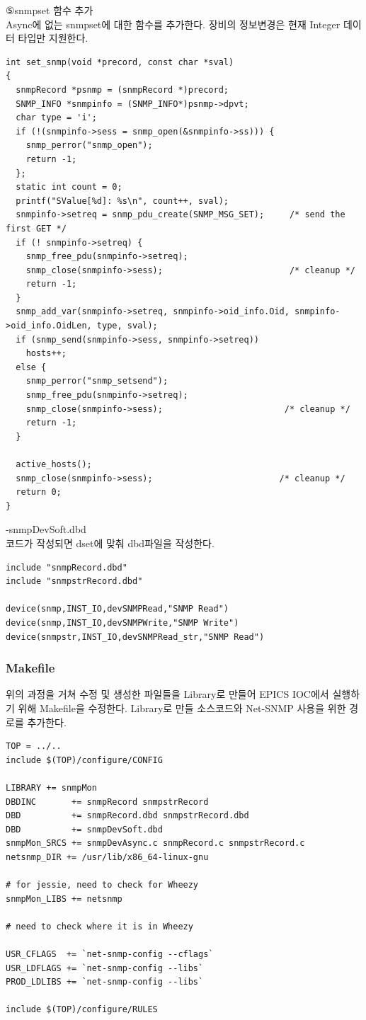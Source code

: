 \documentclass[11pt
  , a4paper
  , article
  , oneside
]{memoir}
\begin{document}
⑤snmpset 함수 추가\\
Async에 없는 snmpset에 대한 함수를 추가한다. 장비의 정보변경은 현재 Integer 데이터 타입만 지원한다.
{\scriptsize
\begin{lstlisting}[style=termstyle]
int set_snmp(void *precord, const char *sval)
{
  snmpRecord *psnmp = (snmpRecord *)precord;
  SNMP_INFO *snmpinfo = (SNMP_INFO*)psnmp->dpvt;
  char type = 'i';
  if (!(snmpinfo->sess = snmp_open(&snmpinfo->ss))) {
    snmp_perror("snmp_open");
    return -1;
  };
  static int count = 0;
  printf("SValue[%d]: %s\n", count++, sval);
  snmpinfo->setreq = snmp_pdu_create(SNMP_MSG_SET);     /* send the first GET */
  if (! snmpinfo->setreq) {
    snmp_free_pdu(snmpinfo->setreq);
    snmp_close(snmpinfo->sess);                         /* cleanup */
    return -1;
  }
  snmp_add_var(snmpinfo->setreq, snmpinfo->oid_info.Oid, snmpinfo->oid_info.OidLen, type, sval);       
  if (snmp_send(snmpinfo->sess, snmpinfo->setreq))
    hosts++;
  else {
    snmp_perror("snmp_setsend");
    snmp_free_pdu(snmpinfo->setreq);
    snmp_close(snmpinfo->sess);                        /* cleanup */
    return -1;
  }

  active_hosts();
  snmp_close(snmpinfo->sess);                         /* cleanup */
  return 0;
}
\end{lstlisting}
}

\hfill

­-snmpDevSoft.dbd\\
코드가 작성되면 dset에 맞춰 dbd파일을 작성한다.


{\scriptsize
\begin{lstlisting}[style=termstyle]
include "snmpRecord.dbd"
include "snmpstrRecord.dbd"

device(snmp,INST_IO,devSNMPRead,"SNMP Read")
device(snmp,INST_IO,devSNMPWrite,"SNMP Write")
device(snmpstr,INST_IO,devSNMPRead_str,"SNMP Read")
\end{lstlisting}
}

\subsubsection{Makefile}
위의 과정을 거쳐 수정 및 생성한 파일들을 Library로 만들어 EPICS IOC에서 실행하기 위해 Makefile을 수정한다. Library로 만들 소스코드와 Net-SNMP 사용을 위한 경로를 추가한다.

{\scriptsize
\begin{lstlisting}[style=termstylenumber]
TOP = ../..
include $(TOP)/configure/CONFIG

LIBRARY += snmpMon
DBDINC       += snmpRecord snmpstrRecord
DBD          += snmpRecord.dbd snmpstrRecord.dbd
DBD          += snmpDevSoft.dbd
snmpMon_SRCS += snmpDevAsync.c snmpRecord.c snmpstrRecord.c
netsnmp_DIR += /usr/lib/x86_64-linux-gnu

# for jessie, need to check for Wheezy
snmpMon_LIBS += netsnmp

# need to check where it is in Wheezy

USR_CFLAGS  += `net-snmp-config --cflags`
USR_LDFLAGS += `net-snmp-config --libs`
PROD_LDLIBS += `net-snmp-config --libs`

include $(TOP)/configure/RULES      
\end{lstlisting}
}
\end{document}
